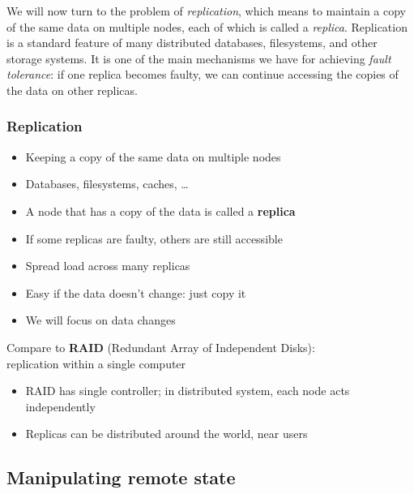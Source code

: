 We will now turn to the problem of \emph{replication}, which means to maintain a copy of the same data on multiple nodes, each of which is called a \emph{replica}.
Replication is a standard feature of many distributed databases, filesystems, and other storage systems.
It is one of the main mechanisms we have for achieving \emph{fault tolerance}: if one replica becomes faulty, we can continue accessing the copies of the data on other replicas.

\begin{frame}
    \label{s:replication-intro}
    \frametitle{Replication}
    \begin{itemize}
        \item Keeping a copy of the same data on multiple nodes
        \item Databases, filesystems, caches, \dots
        \item A node that has a copy of the data is called a \textbf{replica}\pause
        \item If some replicas are faulty, others are still accessible
        \item Spread load across many replicas\pause
        \item Easy if the data doesn't change: just copy it
        \item We will focus on data changes\\[1em]\pause
    \end{itemize}
    Compare to \textbf{RAID} (Redundant Array of Independent Disks):\\replication within a single computer
    \begin{itemize}
        \item RAID has single controller; in distributed system, each node acts independently
        \item Replicas can be distributed around the world, near users
    \end{itemize}
\end{frame}
\label{l:replication-intro}

\subsection{Manipulating remote state}

